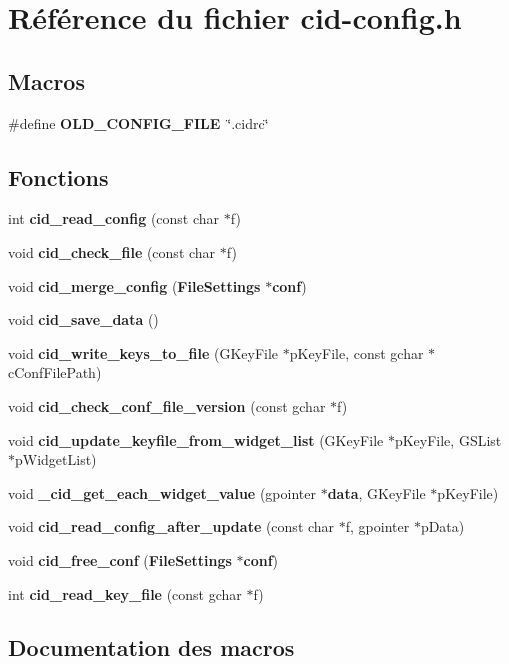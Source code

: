 \section{Référence du fichier cid-config.h}
\label{cid-config_8h}
\subsection*{Macros}
\begin{CompactItemize}
\item 
\#define {\bf OLD\_\-CONFIG\_\-FILE}~\char`\"{}.cidrc\char`\"{}
\end{CompactItemize}
\subsection*{Fonctions}
\begin{CompactItemize}
\item 
int {\bf cid\_\-read\_\-config} (const char $\ast$f)
\item 
void {\bf cid\_\-check\_\-file} (const char $\ast$f)
\item 
void {\bf cid\_\-merge\_\-config} ({\bf FileSettings} $\ast${\bf conf})
\item 
void {\bf cid\_\-save\_\-data} ()
\item 
void {\bf cid\_\-write\_\-keys\_\-to\_\-file} (GKeyFile $\ast$pKeyFile, const gchar $\ast$cConfFilePath)
\item 
void {\bf cid\_\-check\_\-conf\_\-file\_\-version} (const gchar $\ast$f)
\item 
void {\bf cid\_\-update\_\-keyfile\_\-from\_\-widget\_\-list} (GKeyFile $\ast$pKeyFile, GSList $\ast$pWidgetList)
\item 
void {\bf \_\-cid\_\-get\_\-each\_\-widget\_\-value} (gpointer $\ast${\bf data}, GKeyFile $\ast$pKeyFile)
\item 
void {\bf cid\_\-read\_\-config\_\-after\_\-update} (const char $\ast$f, gpointer $\ast$pData)
\item 
void {\bf cid\_\-free\_\-conf} ({\bf FileSettings} $\ast${\bf conf})
\item 
int {\bf cid\_\-read\_\-key\_\-file} (const gchar $\ast$f)
\end{CompactItemize}


\subsection{Documentation des macros}

